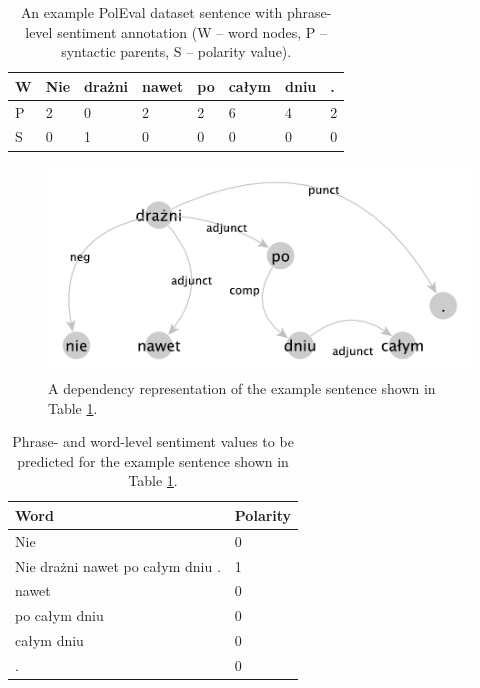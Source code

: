 \documentclass[10pt, a4paper]{article}
\begin{document}
\begin{table}[h]
 \begin{center}
\begin{tabular}{|l| l l l l l l l|}
      \hline
      W & Nie & drażni & nawet & po & całym & dniu & . \\
      \hline
      P & 2 & 0 & 2 & 2 & 6 & 4 & 2 \\
      \hline
      S & 0 & 1 & 0 & 0 & 0 & 0 & 0 \\
      \hline
\end{tabular}
\caption{An example PolEval dataset sentence with phrase-level sentiment annotation (W -- word nodes, P -- syntactic parents, S -- polarity value).}
\label{tab:nie_drazni_1}
 \end{center}
\end{table}



\begin{figure}
  \includegraphics[width=\linewidth]{imgs/nie_drazni.pdf}
  \caption{A dependency representation of the example sentence shown in Table \ref{tab:nie_drazni_1}.}
  \label{fig:dep_sent}
\end{figure}

\begin{table}[h]
 \begin{center}
\begin{tabular}{|l | l|}

\hline
 Word &	Polarity\\
      \hline \hline
     Nie &	0\\
     \hline
Nie drażni nawet po całym dniu	 . & 1\\
\hline
nawet &	0\\
\hline
po całym dniu &	0\\
\hline
całym dniu &	0\\
\hline
.	& 0\\
      \hline
\end{tabular}
\caption{Phrase- and word-level sentiment values to be predicted for the example sentence shown in Table \ref{tab:nie_drazni_1}.}
\label{tab:nie_drazni_2}
 \end{center}
\end{table}
\end{document}
